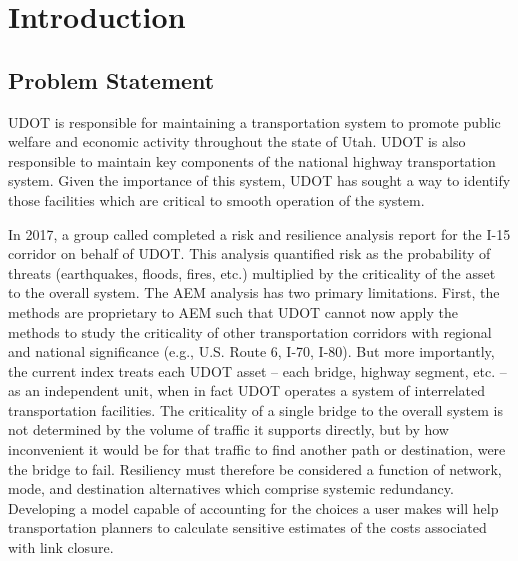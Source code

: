 \chapter{Introduction}
\label{chp:chapter1}
\graphicspath{{figures/}{figures/chapter1/}}

\section{Problem Statement}
UDOT is responsible for maintaining a
transportation system to promote public welfare and economic activity throughout
the state of Utah. UDOT is also responsible to maintain key components of the
national highway transportation system. Given the importance of this system,
UDOT has sought a way to identify those facilities which are critical to smooth
operation of the system.

In 2017, a group called \citet{aem2017} completed a risk and resilience analysis report for the I-15 corridor on behalf of
UDOT. This analysis quantified risk as the probability of threats (earthquakes, floods, fires,
etc.) multiplied by the criticality of the asset to the overall system. The AEM
analysis has two primary limitations. First, the methods are proprietary to
AEM such that UDOT cannot now apply the methods to study the criticality of other transportation
corridors with regional and national significance (e.g., U.S. Route 6, I-70, I-80). But more
importantly, the current index treats each UDOT asset – each bridge, highway segment, etc. – as an
independent unit, when in fact UDOT operates a system of interrelated transportation facilities. The criticality
of a single bridge to the overall system is not determined by the volume of traffic it supports
directly, but by how inconvenient it would be for that traffic to find another path or destination,
were the bridge to fail. Resiliency must therefore be considered a function of network, mode, and destination
alternatives which comprise systemic redundancy. Developing a model capable of accounting for the choices a user makes will help
transportation planners to calculate sensitive estimates of the costs associated with link closure.


